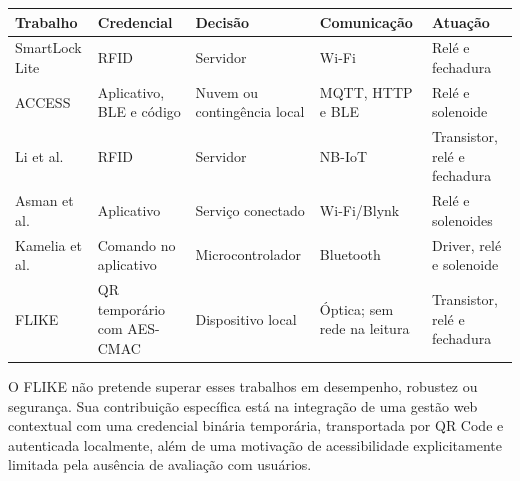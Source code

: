 \begin{quadro}[htbp]
    \caption{Comparação com trabalhos relacionados}
    \label{qua:trabalhos-relacionados}
    \small
    \setlength{\tabcolsep}{3pt}
    \begin{tabular}{|p{}|p{}|p{}|p{}|p{}|}
        \hline
        \textbf{Trabalho} & \textbf{Credencial} & \textbf{Decisão} & \textbf{Comunicação} & \textbf{Atuação} \\ \hline
        SmartLock Lite & RFID & Servidor & Wi-Fi & Relé e fechadura \\ \hline
        ACCESS & Aplicativo, BLE e código & Nuvem ou contingência local & MQTT, HTTP e BLE & Relé e solenoide \\ \hline
        Li et al. & RFID & Servidor & NB-IoT & Transistor, relé e fechadura \\ \hline
        Asman et al. & Aplicativo & Serviço conectado & Wi-Fi/Blynk & Relé e solenoides \\ \hline
        Kamelia et al. & Comando no aplicativo & Microcontrolador & Bluetooth & Driver, relé e solenoide \\ \hline
        FLIKE & QR temporário com AES-CMAC & Dispositivo local & Óptica; sem rede na leitura & Transistor, relé e fechadura \\ \hline
    \end{tabular}
\end{quadro}

O FLIKE não pretende superar esses trabalhos em desempenho, robustez ou segurança. Sua contribuição específica está na integração de uma gestão web contextual com uma credencial binária temporária, transportada por QR Code e autenticada localmente, além de uma motivação de acessibilidade explicitamente limitada pela ausência de avaliação com usuários.
